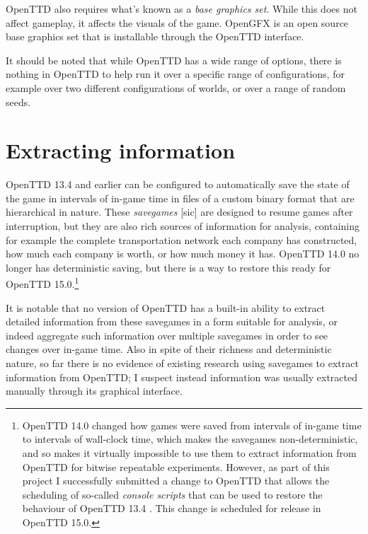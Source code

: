 \documentclass[logo,msc,dsti]{style/infthesis}    %
\begin{document}
{\begin{itemize}
\end{itemize}
%
OpenTTD also requires what's known as a \emph{base graphics set}. While this does not affect gameplay, it affects the visuals of the game. OpenGFX \cite{OpenGFXSource} is an open source base graphics set that is installable through the OpenTTD interface.

It should be noted that while OpenTTD has a wide range of options, there is nothing in OpenTTD to help run it over a specific range of configurations, for example over two different configurations of worlds, or over a range of random seeds.

\section{Extracting information}

OpenTTD 13.4 and earlier can be configured to automatically save the state of the game in intervals of in-game time in files of a custom binary format that are hierarchical in nature. These \emph{savegames} [sic] are designed to resume games after interruption, but they are also rich sources of information for analysis, containing for example the complete transportation network each company has constructed, how much each company is worth, or how much money it has. OpenTTD 14.0 no longer has deterministic saving, but there is a way to restore this ready for OpenTTD 15.0.\footnote{OpenTTD 14.0 changed how games were saved from intervals of in-game time to intervals of wall-clock time, which makes the savegames non-deterministic, and so makes it virtually impossible to use them to extract information from OpenTTD for bitwise repeatable experiments. However, as part of this project I successfully submitted a change to OpenTTD that allows the scheduling of so-called \emph{console scripts} that can be used to restore the behaviour of OpenTTD 13.4 \cite{OpenTTDScheduleScript}. This change is scheduled for release in OpenTTD 15.0.}

It is notable that no version of OpenTTD has a built-in ability to extract detailed information from these savegames in a form suitable for analysis, or indeed aggregate such information over multiple savegames in order to see changes over in-game time. Also in spite of their richness and deterministic nature, so far there is no evidence of existing research using savegames to extract information from OpenTTD; I suspect instead information was usually extracted manually through its graphical interface.

}
\end{document}
